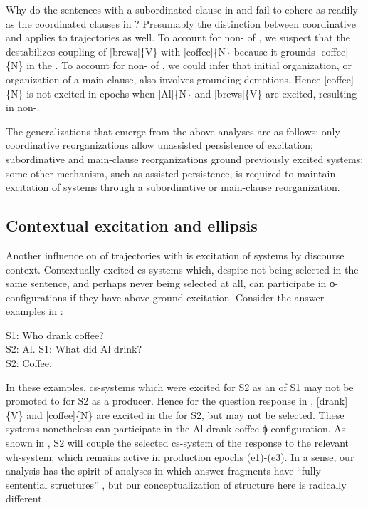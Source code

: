   Why do the sentences with a subordinated clause in  and  fail to cohere as readily as the coordinated clauses in ? Presumably the distinction between coordinative and  applies to  trajectories as well. To account for non- of , we suspect that the  destabilizes coupling of [brews]\{V\} with [coffee]\{N\} because it grounds [coffee]\{N\} in the . To account for non- of , we could infer that initial organization, or organization of a main clause, also involves grounding demotions. Hence [coffee]\{N\} is not excited in epochs when [Al]\{N\} and [brews]\{V\} are excited, resulting in non-. 

  The generalizations that emerge from the above analyses are as follows: only coordinative reorganizations allow unassisted persistence of excitation; subordinative and main-clause reorganizations ground previously excited systems; some other mechanism, such as assisted persistence, is required to maintain excitation of systems through a subordinative or main-clause reorganization. 

\subsection{Contextual excitation and ellipsis}

Another influence on  of trajectories with  is excitation of systems by discourse context. Contextually excited cs-systems which, despite not being selected in the same sentence, and perhaps never being selected at all, can participate in ϕ-con\-fig\-u\-ra\-tions if they have above-ground excitation. Consider the answer  examples in :

\ea\label{ex:7:8}
    \ea S1: {Who drank coffee?}\\  S2: {Al}.\label{ex:7:8a}
    \ex S1: {What did Al drink?}\\  S2: {Coffee.}\label{ex:7:8b}
\z
\z

  In these examples, cs-systems which were excited for S2 as an  of S1 may not be promoted to  for S2 as a producer. Hence for the question response in , [drank]\{V\} and [coffee]\{N\} are excited in the  for S2, but may not be selected. These systems nonetheless can participate in the {\textbar}Al drank coffee{\textbar} ϕ-con\-fig\-u\-ra\-tion. As shown in {}, S2 will couple the selected cs-system of the response to the relevant wh-system, which remains active in production epochs (e1)-(e3). In a sense, our analysis has the spirit of analyses in which answer fragments have “fully sentential structures”  \citep{Merchant2005}, but our conceptualization of structure here is radically different.

